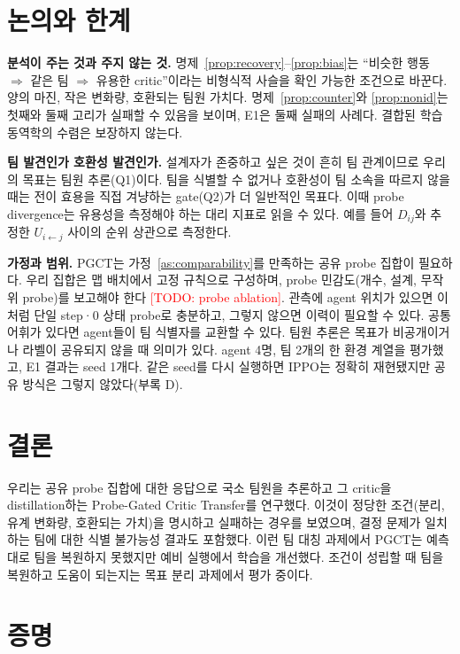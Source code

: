 \documentclass[twocolumn,10pt]{article}
\theoremstyle{remark}
\newcommand{\todo}[1]{\textcolor{red}{[TODO: #1]}}
\newcommand{\ours}{PGCT}
\begin{document}
\section{논의와 한계}
\textbf{분석이 주는 것과 주지 않는 것.} 명제~\ref{prop:recovery}--\ref{prop:bias}는 ``비슷한 행동 $\Rightarrow$ 같은 팀 $\Rightarrow$ 유용한 critic''이라는 비형식적 사슬을
확인 가능한 조건으로 바꾼다. 양의 마진, 작은 변화량, 호환되는 팀원 가치다. 명제~\ref{prop:counter}와 \ref{prop:nonid}는 첫째와 둘째 고리가 실패할 수 있음을 보이며, E1은 둘째 실패의
사례다. 결합된 학습 동역학의 수렴은 보장하지 않는다.

\textbf{팀 발견인가 호환성 발견인가.} 설계자가 존중하고 싶은 것이 흔히 팀 관계이므로 우리의 목표는 팀원 추론(Q1)이다. 팀을 식별할 수 없거나 호환성이 팀 소속을 따르지 않을 때는
전이 효용을 직접 겨냥하는 gate(Q2)가 더 일반적인 목표다. 이때 probe divergence는 유용성을 측정해야 하는 대리 지표로 읽을 수 있다. 예를 들어 $D_{ij}$와 추정한
$U_{i\leftarrow j}$ 사이의 순위 상관으로 측정한다.

\textbf{가정과 범위.} \ours{}는 가정~\ref{as:comparability}를 만족하는 공유 probe 집합이 필요하다. 우리 집합은 맵 배치에서 고정 규칙으로 구성하며, probe 민감도(개수, 설계,
무작위 probe)를 보고해야 한다 \todo{probe ablation}. 관측에 agent 위치가 있으면 이처럼 단일 step·0 상태 probe로 충분하고, 그렇지 않으면 이력이 필요할 수 있다. 공통 어휘가
있다면 agent들이 팀 식별자를 교환할 수 있다. 팀원 추론은 목표가 비공개이거나 라벨이 공유되지 않을 때 의미가 있다. agent 4명, 팀 2개의 한 환경 계열을 평가했고, E1 결과는 seed
1개다. 같은 seed를 다시 실행하면 IPPO는 정확히 재현됐지만 공유 방식은 그렇지 않았다(부록 D).

\section{결론}
우리는 공유 probe 집합에 대한 응답으로 국소 팀원을 추론하고 그 critic을 distillation하는 Probe-Gated Critic Transfer를 연구했다. 이것이 정당한 조건(분리, 유계 변화량, 호환되는 가치)을
명시하고 실패하는 경우를 보였으며, 결정 문제가 일치하는 팀에 대한 식별 불가능성 결과도 포함했다. 이런 팀 대칭 과제에서 \ours{}는 예측대로 팀을 복원하지 못했지만 예비 실행에서
학습을 개선했다. 조건이 성립할 때 팀을 복원하고 도움이 되는지는 목표 분리 과제에서 평가 중이다.




\clearpage
\appendix
\onecolumn

\section{증명}
\end{document}
